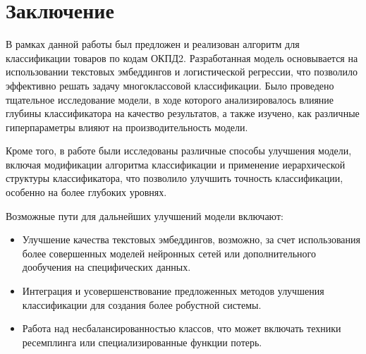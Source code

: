 \documentclass{article}
\begin{document}
\section{Заключение}


В рамках данной работы был предложен и реализован алгоритм для классификации товаров по кодам ОКПД2. Разработанная модель основывается на использовании текстовых эмбеддингов и логистической регрессии, что позволило эффективно решать задачу многоклассовой классификации. Было проведено тщательное исследование модели, в ходе которого анализировалось влияние глубины классификатора на качество результатов, а также изучено, как различные гиперпараметры влияют на производительность модели.

Кроме того, в работе были исследованы различные способы улучшения модели, включая модификации алгоритма классификации и применение иерархической структуры классификатора, что позволило улучшить точность классификации, особенно на более глубоких уровнях.

Возможные пути для дальнейших улучшений модели включают:

\begin{itemize}
    \item Улучшение качества текстовых эмбеддингов, возможно, за счет использования более совершенных моделей нейронных сетей или дополнительного дообучения на специфических данных.
    \item Интеграция и усовершенствование предложенных методов улучшения классификации для создания более робустной системы.
    \item Работа над несбалансированностью классов, что может включать техники ресемплинга или специализированные функции потерь.
\end{itemize}




\end{document}

